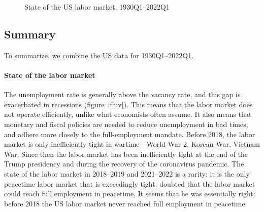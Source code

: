 \documentclass[letterpaper,12pt,leqno]{article}
\newcommand{\pdf}{figures.pdf}
\begin{document}
\newlength{\imageheight}
\begin{figure}[p]
\vfig
{}\vfig
{}
\caption{State of the US labor market, 1930Q1--2022Q1}
\label{f:summary}\end{figure}

\subsection{Summary}

To summarize, we combine the US data for 1930Q1--2022Q1.

\paragraph{State of the labor market} The unemployment rate is generally above the vacancy rate, and this gap is exacerbated in recessions (figure~\ref{f:uv}). This means that the labor market does not operate efficiently, unlike what economists often assume. It also means that monetary and fiscal policies are needed to reduce unemployment in bad times, and adhere more closely to the full-employment mandate. Before 2018, the labor market is only inefficiently tight in wartime---World War 2, Korean War, Vietnam War. Since then the labor market has been inefficiently tight at the end of the Trump presidency and during the recovery of the coronavirus pandemic. The state of the labor market in 2018--2019 and 2021--2022 is a rarity: it is the only peacetime labor market that is exceedingly tight. \citet[p. 322]{K36} doubted that the labor market could reach full employment in peacetime. It seems that he was essentially right: before 2018 the US labor market never reached full employment in peacetime.
\end{document}
